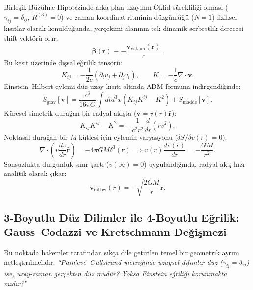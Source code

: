 \documentclass[11pt,a4paper]{article}
\begin{document}
Birleşik Büzülme Hipotezinde arka plan uzayının Öklid sürekliliği olması ($\gamma_{ij} = \delta_{ij}$, $R^{(3)} = 0$) ve zaman koordinat ritminin düzgünlüğü ($N = 1$) fiziksel kısıtlar olarak konulduğunda, yerçekimi alanının tek dinamik serbestlik derecesi shift vektörü olur:
\begin{equation}
    \boldsymbol{\beta}(\mathbf{r}) \equiv -\frac{\mathbf{v}_{\mathrm{vakum}}(\mathbf{r})}{c}.
    \label{eq:shift_vektor_p1}
\end{equation}
Bu kesit üzerinde dışsal eğrilik tensörü:
\begin{equation}
    K_{ij} = -\frac{1}{2c} \left( \partial_i v_j + \partial_j v_i \right), \qquad K = -\frac{1}{c} \nabla \cdot \mathbf{v}.
\end{equation}
Einstein--Hilbert eylemi düz uzay kısıtı altında ADM formuna indirgendiğinde:
\begin{equation}
    S_{\mathrm{grav}}[\mathbf{v}] = \frac{c^3}{16\pi G} \int dt d^3x \left( K_{ij} K^{ij} - K^2 \right) + S_{\mathrm{madde}}[\mathbf{v}].
\end{equation}
Küresel simetrik durağan bir radyal akışta ($\mathbf{v} = v(r) \hat{\mathbf{r}}$):
\begin{equation}
    K_{ij} K^{ij} - K^2 = -\frac{1}{c^2 r^2} \frac{d}{dr}\left( r v^2 \right).
\end{equation}
Noktasal durağan bir $M$ kütlesi için eylemin varyasyonu ($\delta S / \delta v(r) = 0$):
\begin{equation}
    \nabla \cdot \left( v \frac{dv}{dr} \hat{\mathbf{r}} \right) = -4\pi G M \delta^3(\mathbf{r}) \implies v(r) \frac{dv(r)}{dr} = -\frac{GM}{r^2}.
\end{equation}
Sonsuzlukta durgunluk sınır şartı ($v(\infty) = 0$) uygulandığında, radyal akış hızı analitik olarak çıkar:
\begin{equation}
    \mathbf{v}_{\mathrm{inflow}}(r) = -\sqrt{\frac{2GM}{r}}\hat{\mathbf{r}}.
    \label{eq:nehir_hizi}
\end{equation}

\subsection{3-Boyutlu Düz Dilimler ile 4-Boyutlu Eğrilik: Gauss--Codazzi ve Kretschmann Değişmezi}
\label{sec:gauss_codazzi_egrilik}

Bu noktada hakemler tarafından sıkça dile getirilen temel bir geometrik ayrım netleştirilmelidir: \textit{``Painlevé--Gullstrand metriğinde uzaysal dilimler düz ($\gamma_{ij} = \delta_{ij}$) ise, uzay-zaman gerçekten düz müdür? Yoksa Einstein eğriliği korunmakta mıdır?''}
\end{document}
